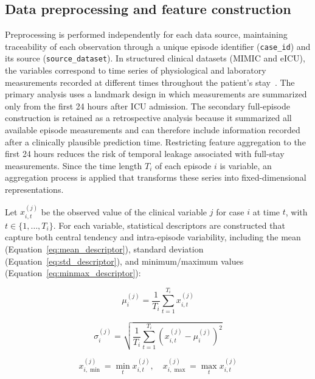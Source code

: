 \documentclass[utf8]{FrontiersinHarvard} %
\begin{document}
\subsection{Data preprocessing and feature construction}

Preprocessing is performed independently for each data source, maintaining traceability of each observation through a unique episode identifier (\texttt{case\_id}) and its source (\texttt{source\_dataset}). In structured clinical datasets (MIMIC and eICU), the variables correspond to time series of physiological and laboratory measurements recorded at different times throughout the patient's stay~\citet{Wan2025}. The primary analysis uses a landmark design in which measurements are summarized only from the first 24 hours after ICU admission. The secondary full-episode construction is retained as a retrospective analysis because it summarized all available episode measurements and can therefore include information recorded after a clinically plausible prediction time. Restricting feature aggregation to the first 24 hours reduces the risk of temporal leakage associated with full-stay measurements. Since the time length $T_i$ of each episode $i$ is variable, an aggregation process is applied that transforms these series into fixed-dimensional representations.

Let $x_{i,t}^{(j)}$ be the observed value of the clinical variable $j$ for case $i$ at time $t$, with $t \in \{1, \dots, T_i\}$. For each variable, statistical descriptors are constructed that capture both central tendency and intra-episode variability, including the mean (Equation~\ref{eq:mean_descriptor}), standard deviation (Equation~\ref{eq:std_descriptor}), and minimum/maximum values (Equation~\ref{eq:minmax_descriptor}):

\begin{equation}
	\mu_i^{(j)} = \frac{1}{T_i} \sum_{t=1}^{T_i} x_{i,t}^{(j)}
	\label{eq:mean_descriptor}
\end{equation}

\begin{equation}
	\sigma_i^{(j)} = \sqrt{\frac{1}{T_i} \sum_{t=1}^{T_i} \left(x_{i,t}^{(j)} - \mu_i^{(j)} \right)^2}
	\label{eq:std_descriptor}
\end{equation}

\begin{equation}
	x_{i,\min}^{(j)} = \min_{t} x_{i,t}^{(j)}, \quad
	x_{i,\max}^{(j)} = \max_{t} x_{i,t}^{(j)}
	\label{eq:minmax_descriptor}
\end{equation}
\end{document}
